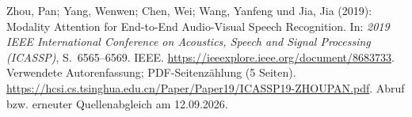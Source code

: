 \par\smallskip
\begin{samepage}
\noindent
Zhou, Pan; Yang, Wenwen; Chen, Wei; Wang, Yanfeng und Jia, Jia (2019):
Modality Attention for End-to-End Audio-Visual Speech Recognition.
In: \textit{2019 IEEE International Conference on Acoustics, Speech and Signal Processing
(ICASSP)}, S.~6565--6569.
IEEE.
\url{https://ieeexplore.ieee.org/document/8683733}.
Verwendete Autorenfassung; PDF-Seitenzählung (5 Seiten). \url{https://hcsi.cs.tsinghua.edu.cn/Paper/Paper19/ICASSP19-ZHOUPAN.pdf}.
Abruf bzw. erneuter Quellenabgleich am 12.09.2026.
\par\end{samepage}
